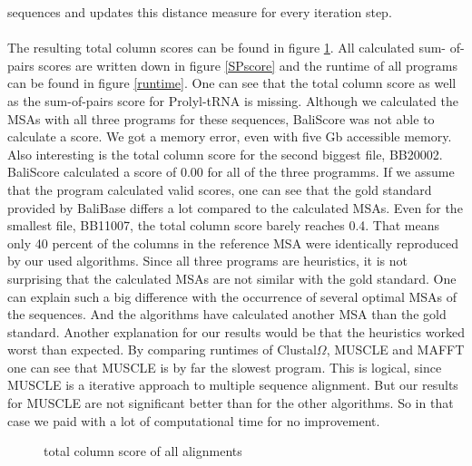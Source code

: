 \documentclass[%
   10pt,              %
   nenglish,           %
   a4paper,           %
   DIV11,             %
]{scrartcl}%
\begin{document}
sequences and updates this distance measure for every iteration step.\\
\\
\noindent The resulting total column scores can be found in figure \ref{totCol}. All calculated sum-
of-pairs scores are written down in figure \ref{SPscore} and the runtime of all programs can be found 
in figure \ref{runtime}. One can see that the total column score as well as the sum-of-pairs 
score for Prolyl-tRNA is missing. Although we calculated the MSAs with all three programs for these 
sequences, BaliScore was not able to calculate a score. We got a memory error, even with five Gb 
accessible memory. Also interesting is the total column score for the second biggest file, BB20002. 
BaliScore calculated a score of 0.00 for all of the three programms. If we assume that the 
program calculated valid scores, one can see that the gold standard provided by BaliBase differs 
a lot compared to the calculated MSAs. Even for the smallest file, BB11007, the total column score 
barely reaches 0.4. That means only 40 percent of the columns in the reference MSA were identically 
reproduced by our used algorithms. Since all three programs are heuristics, it is not surprising 
that the calculated MSAs are not similar with the gold standard. One can explain such a big difference 
with the occurrence of several optimal MSAs of the sequences. And the algorithms have calculated 
another MSA than the gold standard. Another explanation for our results would be that the heuristics 
worked worst than expected. By comparing runtimes of Clustal$\Omega$, MUSCLE and MAFFT one can see 
that MUSCLE is by far the slowest program. This is logical, since MUSCLE is a iterative approach to 
multiple sequence alignment. But our results for MUSCLE are not significant better than for the other 
algorithms. So in that case we paid with a lot of computational time for no improvement.


\begin{figure}[ht]
 \centering
 \caption{total column score of all alignments}
 \label{totCol}
\end{figure}
\end{document}
